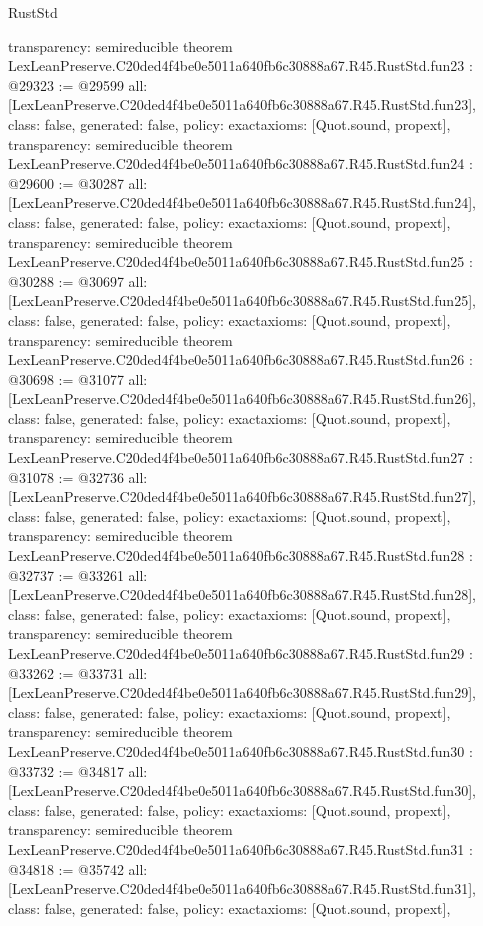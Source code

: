 \begin{lexlean}{RustStd}
\begin{coremodule}
{  transparency: semireducible
}
theorem LexLeanPreserve.C20ded4f4be0e5011a640fb6c30888a67.R45.RustStd.fun23 : @29323 := @29599 {
  all: [LexLeanPreserve.C20ded4f4be0e5011a640fb6c30888a67.R45.RustStd.fun23],
  class: false,
  generated: false,
  policy: exact{axioms: [Quot.sound, propext]},
  transparency: semireducible
}
theorem LexLeanPreserve.C20ded4f4be0e5011a640fb6c30888a67.R45.RustStd.fun24 : @29600 := @30287 {
  all: [LexLeanPreserve.C20ded4f4be0e5011a640fb6c30888a67.R45.RustStd.fun24],
  class: false,
  generated: false,
  policy: exact{axioms: [Quot.sound, propext]},
  transparency: semireducible
}
theorem LexLeanPreserve.C20ded4f4be0e5011a640fb6c30888a67.R45.RustStd.fun25 : @30288 := @30697 {
  all: [LexLeanPreserve.C20ded4f4be0e5011a640fb6c30888a67.R45.RustStd.fun25],
  class: false,
  generated: false,
  policy: exact{axioms: [Quot.sound, propext]},
  transparency: semireducible
}
theorem LexLeanPreserve.C20ded4f4be0e5011a640fb6c30888a67.R45.RustStd.fun26 : @30698 := @31077 {
  all: [LexLeanPreserve.C20ded4f4be0e5011a640fb6c30888a67.R45.RustStd.fun26],
  class: false,
  generated: false,
  policy: exact{axioms: [Quot.sound, propext]},
  transparency: semireducible
}
theorem LexLeanPreserve.C20ded4f4be0e5011a640fb6c30888a67.R45.RustStd.fun27 : @31078 := @32736 {
  all: [LexLeanPreserve.C20ded4f4be0e5011a640fb6c30888a67.R45.RustStd.fun27],
  class: false,
  generated: false,
  policy: exact{axioms: [Quot.sound, propext]},
  transparency: semireducible
}
theorem LexLeanPreserve.C20ded4f4be0e5011a640fb6c30888a67.R45.RustStd.fun28 : @32737 := @33261 {
  all: [LexLeanPreserve.C20ded4f4be0e5011a640fb6c30888a67.R45.RustStd.fun28],
  class: false,
  generated: false,
  policy: exact{axioms: [Quot.sound, propext]},
  transparency: semireducible
}
theorem LexLeanPreserve.C20ded4f4be0e5011a640fb6c30888a67.R45.RustStd.fun29 : @33262 := @33731 {
  all: [LexLeanPreserve.C20ded4f4be0e5011a640fb6c30888a67.R45.RustStd.fun29],
  class: false,
  generated: false,
  policy: exact{axioms: [Quot.sound, propext]},
  transparency: semireducible
}
theorem LexLeanPreserve.C20ded4f4be0e5011a640fb6c30888a67.R45.RustStd.fun30 : @33732 := @34817 {
  all: [LexLeanPreserve.C20ded4f4be0e5011a640fb6c30888a67.R45.RustStd.fun30],
  class: false,
  generated: false,
  policy: exact{axioms: [Quot.sound, propext]},
  transparency: semireducible
}
theorem LexLeanPreserve.C20ded4f4be0e5011a640fb6c30888a67.R45.RustStd.fun31 : @34818 := @35742 {
  all: [LexLeanPreserve.C20ded4f4be0e5011a640fb6c30888a67.R45.RustStd.fun31],
  class: false,
  generated: false,
  policy: exact{axioms: [Quot.sound, propext]},
}
\end{coremodule}
\end{lexlean}
